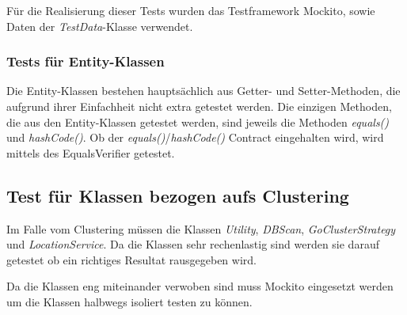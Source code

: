 \documentclass[11pt,a4paper]{scrartcl}
\begin{document}
Für die Realisierung dieser Tests wurden das Testframework Mockito, sowie Daten der \textit{TestData}-Klasse verwendet.

\subsubsection{Tests für Entity-Klassen}
Die Entity-Klassen bestehen hauptsächlich aus Getter- und Setter-Methoden, die aufgrund ihrer Einfachheit nicht extra getestet werden. Die einzigen Methoden, die aus den Entity-Klassen getestet werden, sind jeweils die Methoden \textit{equals()} und \textit{hashCode()}. Ob der \textit{equals()}/\textit{hashCode()} Contract eingehalten wird, wird mittels des EqualsVerifier getestet.

\subsection{Test für Klassen bezogen aufs Clustering}
Im Falle vom Clustering müssen die Klassen \textit{Utility}, \textit{DBScan}, \textit{GoClusterStrategy} und \textit{LocationService}. Da die Klassen sehr rechenlastig sind werden sie darauf getestet ob ein richtiges Resultat rausgegeben wird.

Da die Klassen eng miteinander verwoben sind muss Mockito eingesetzt werden um die Klassen halbwegs isoliert testen zu können.
\end{document}
